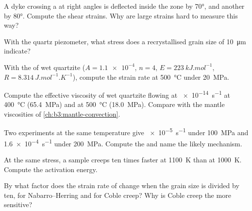 \begin{exercise}[$\star$]\label{exo:b3:deformation-mechanisms:2}
A dyke crossing a  at right angles is deflected inside the zone by
\ang{70}, and another by \ang{80}. Compute the shear strains. Why are large
strains hard to measure this way?
\end{exercise}

\begin{exercise}[$\star$]\label{exo:b3:deformation-mechanisms:3}
With the quartz piezometer, what stress does a recrystallised grain size of
\qty{10}{\micro m} indicate?
\end{exercise}

\begin{exercise}[$\star$]\label{exo:b3:deformation-mechanisms:4}
With the  of wet quartzite ($A = \num{1.1e-4}$, $n = 4$, $E =
\qty{223}{kJ.mol^{-1}}$, $R = \qty{8.314}{J.mol^{-1}.K^{-1}}$), compute the
strain rate at \qty{500}{\celsius} under \qty{20}{MPa}.
\end{exercise}

\begin{exercise}[$\star\star$]\label{exo:b3:deformation-mechanisms:5}
Compute the effective viscosity of wet quartzite flowing at \qty{e-14}{s^{-1}}
at \qty{400}{\celsius} (\qty{65.4}{MPa}) and at \qty{500}{\celsius}
(\qty{18.0}{MPa}). Compare with the mantle viscosities of
\cref{ch:b3:mantle-convection}.
\end{exercise}

\begin{exercise}[$\star\star$]\label{exo:b3:deformation-mechanisms:6}
Two experiments at the same temperature give \qty{e-5}{s^{-1}} under
\qty{100}{MPa} and \qty{1.6e-4}{s^{-1}} under \qty{200}{MPa}. Compute the  and name the likely mechanism.
\end{exercise}

\begin{exercise}[$\star\star$]\label{exo:b3:deformation-mechanisms:7}
At the same stress, a sample creeps ten times faster at \qty{1100}{K} than at
\qty{1000}{K}. Compute the activation energy.
\end{exercise}

\begin{exercise}[$\star\star$]\label{exo:b3:deformation-mechanisms:8}
By what factor does the strain rate of  change when the grain
size is divided by ten, for Nabarro--Herring and for Coble creep? Why is Coble
creep the more sensitive?
\end{exercise}


